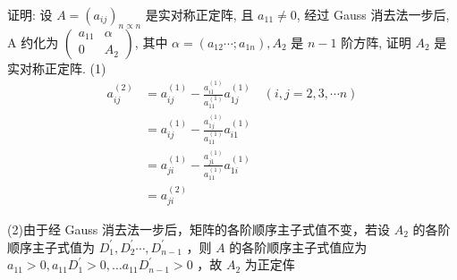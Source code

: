   \begin{tcolorbox}[enhanced,colback=10,colframe=9,breakable,coltitle=green!25!black,title=2024]
  
证明: 设 $ A=\left(a_{i j}\right)_{n \propto n} $ 是实对称正定阵, 且 $ a_{11} \neq 0 $, 经过 Gauss 消去法一步后, $ \mathrm{A} $ 约化为 $ \left(\begin{array}{cc}a_{11} & \alpha \\ 0 & A_{2}\end{array}\right) $, 其中 $ \alpha=\left(a_{12} \cdots ; a_{1 n}\right), A_{2} $ 是 $n-1$ 阶方阵, 证明 $ A_{2} $ 是实对称正定阵.
\tcblower
(1)
$$
\begin{aligned}
a_{i j}^{(2)} & =a_{i j}^{(1)}-\frac{a_{i 1}^{(1)}}{a_{11}^{(1)}} a_{1 j}^{(1)} \quad(i, j=2,3, \cdots n) \\
& =a_{i j}^{(1)}-\frac{a_{1 j}^{(1)}}{a_{11}^{(1)}} a_{i 1}^{(1)} \\
& =a_{j i}^{(1)}-\frac{a_{j 1}^{(1)}}{a_{11}^{(1)}} a_{1 i}^{(1)} \\
& =a_{j i}^{(2)}
\end{aligned}
$$

(2)由于经 Gauss 消去法一步后，矩阵的各阶顺序主子式值不变，若设 $A_{2} $ 的各阶顺序主子式值为 $ D_{1}^{\prime}, D_{2}^{\prime} \cdots, D_{n-1}^{\prime} $ ，则 $ A $ 的各阶顺序主子式值应为 $ a_{11}>0, a_{11} D_{1}^{\prime}>0, \ldots a_{11} D_{n-1}^{\prime}>0 $ ，故 $ A_{2} $ 为正定伡
\end{tcolorbox}

